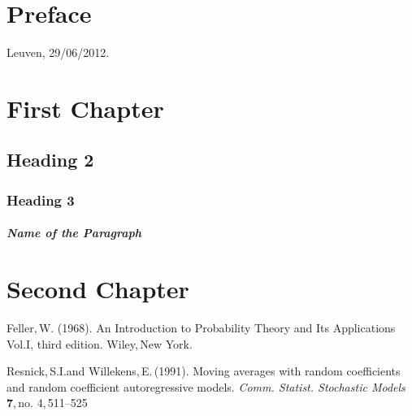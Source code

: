 \documentclass[11pt,a4paper]{book}
\begin{document}
\pagestyle{empty}
\tableofcontents

\chapter*{Preface\hfill} 

\begin{flushright}
Leuven, 29/06/2012.
\end{flushright}


\mainmatter

\pagestyle{headings}
\chapter{First Chapter}%

\section{Heading 2}%

\subsection{Heading 3}

\paragraph{Name of the Paragraph}

\chapter{Second Chapter}




\begin{thebibliography}{99}


{\sc Feller,\,W.} (1968).
An Introduction to Probability Theory and Its Applications Vol.I, third edition.
{\em}Wiley,\,New York.

{\sc Resnick,\,S.I.and Willekens,\,E.}\,(1991).
Moving averages with random coefficients and random coefficient autoregressive models.
{\em Comm. Statist. Stochastic Models} \,{\bf 7},\,no. 4,\,511--525


\end{thebibliography}
\vfill
\end{document}
